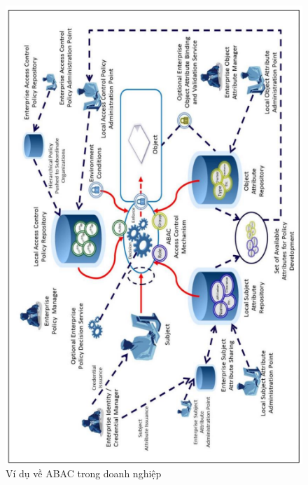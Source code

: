 \begin{figure}
    \centering
    \includegraphics{graphics/chapter-2/chap2-enterprise-abac.png}
    \caption{Ví dụ về ABAC trong doanh nghiệp}
    \label{fig:chap2-enterprise-abac}
\end{figure}

